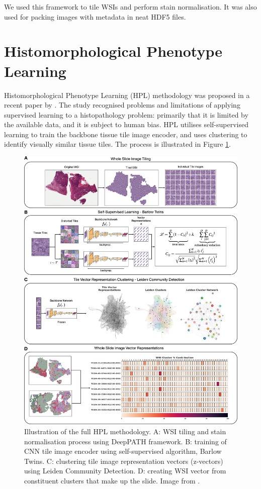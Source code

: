 \documentclass{l4proj}
\begin{document}
We used this framework to tile WSIs and perform stain normalisation. It was also used for packing images with metadata in neat HDF5 files.

\section{Histomorphological Phenotype Learning} \label{sec:HPL}
Histomorphological Phenotype Learning (HPL) methodology was proposed in a recent paper by \cite{ClaudioQuiros2024}. The study recognised problems and limitations of applying supervised learning to a histopathology problem: primarily that it is limited by the available data, and it is subject to human bias. HPL utilises self-supervised learning to train the backbone tissue tile image encoder, and uses clustering to identify visually similar tissue tiles. The process is illustrated in Figure \ref{fig:HPL}.

\begin{figure}
    \centering
    \includegraphics[width=1\linewidth]{images/HPL.png.jpg}
    \caption{Illustration of the full HPL methodology. A: WSI tiling and stain normalisation process using DeepPATH framework. B: training of CNN tile image encoder using self-supervised algorithm, Barlow Twins. C: clustering tile image representation vectors (z-vectors) using Leiden Community Detection. D: creating WSI vector from constituent clusters that make up the slide. Image from \cite{ClaudioQuiros2024}.}
    \label{fig:HPL}
\end{figure}
\end{document}

